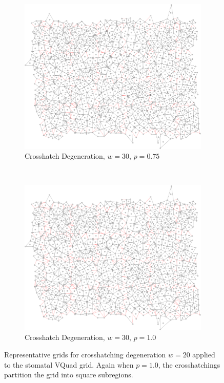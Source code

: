 \documentclass[a4paper,11pt]{report}
\begin{document}
\begin{figure}[htp]
\begin{subfigure}[t]{0.4\textwidth}
  \end{subfigure}

\begin{subfigure}[t]{0.4\textwidth}
  \centering
  \includegraphics[width=\textwidth]{ch6_figs/cross_hatch_p75_w30}
  \caption{Crosshatch Degeneration, $w=30$, $p=0.75$}

  \end{subfigure}
~
\begin{subfigure}[t]{0.4\textwidth}
  \centering
  \includegraphics[width=\textwidth]{ch6_figs/cross_hatch_p100_w30}
  \caption{Crosshatch Degeneration, $w=30$, $p=1.0$}

  \end{subfigure}

\caption[Crosshatch Degeneration, $w=30$]{
  Representative grids for crosshatching degeneration $w=20$ applied to the stomatal VQuad grid. Again when $p=1.0$, the crosshatchings partition the grid into square subregions.
}
\label{fig:ch_w30_grid}
\end{figure}
\end{document}
